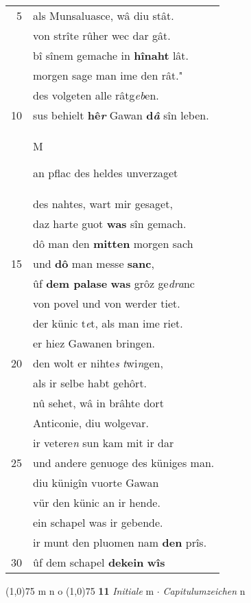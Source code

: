 \documentclass[8pt,a4paper,notitlepage]{article}
\begin{document}
\begin{table}[ht]
\begin{minipage}[t]{0.5\linewidth}
\begin{tabular}{rl}
5 & als Munsaluasce, wâ diu stât.\\ 
 & von strîte rûher wec dar gât.\\ 
 & bî sînem gemache in \textbf{hînaht} lât.\\ 
 & morgen sage man ime den rât."\\ 
 & des volgeten alle  râtg\textit{eb}en.\\ 
10 & sus behielt \textbf{hê\textit{r}} Gawan \textbf{d\textit{â}} sîn leben.\\ 
 & \begin{large}M\end{large}an pflac des heldes unverzaget\\ 
 & des nahtes, wart mir gesaget,\\ 
 & daz harte guot \textbf{was} sîn gemach.\\ 
 & dô man den \textbf{mitten} morgen sach\\ 
15 & und \textbf{dô} man messe \textbf{sanc},\\ 
 & ûf \textbf{dem palase} \textbf{was} grôz ge\textit{dra}nc\\ 
 & von povel und von werder tiet.\\ 
 & der künic t\textit{e}t, als man ime riet.\\ 
 & er hiez Gawanen bringen.\\ 
20 & den wolt er nihte\textit{s} \textit{t}wi\textit{n}gen,\\ 
 & als ir selbe habt gehôrt.\\ 
 & nû sehet, wâ in brâhte dort\\ 
 & Anticonie, diu wolgevar.\\ 
 & ir vetere\textit{n} sun kam mit ir dar\\ 
25 & und andere genuoge des küniges man.\\ 
 & diu künigîn vuorte Gawan\\ 
 & vür den künic an ir hende.\\ 
 & ein schapel was ir gebende.\\ 
 & ir munt den pluomen nam \textbf{den} prîs.\\ 
30 & ûf dem schapel \textbf{dekein} \textbf{wîs}\\ 
\end{tabular}
\scriptsize
\line(1,0){75} \newline
m n o \newline
\line(1,0){75} \newline
\textbf{11} \textit{Initiale} m   $\cdot$ \textit{Capitulumzeichen} n  \newline

\end{minipage}
\end{table}
\end{document}
